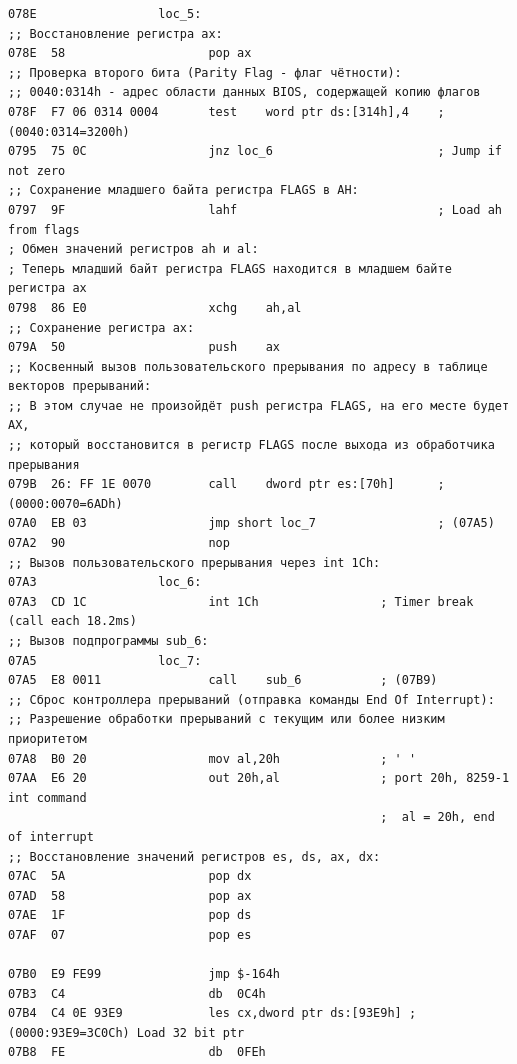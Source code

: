 \documentclass[a4paper,14pt]{article}
\begin{document}
\begin{lstlisting}[style={asm}]
078E				 loc_5:
;; Восстановление регистра ax:
078E  58					pop	ax
;; Проверка второго бита (Parity Flag - флаг чётности):
;; 0040:0314h - адрес области данных BIOS, содержащей копию флагов
078F  F7 06 0314 0004		test	word ptr ds:[314h],4	; (0040:0314=3200h)
0795  75 0C					jnz	loc_6						; Jump if not zero
;; Сохранение младшего байта регистра FLAGS в AH:
0797  9F					lahf							; Load ah from flags
; Обмен значений регистров ah и al: 
; Теперь младший байт регистра FLAGS находится в младшем байте регистра ax
0798  86 E0					xchg	ah,al
;; Сохранение регистра ax:
079A  50					push	ax
;; Косвенный вызов пользовательского прерывания по адресу в таблице векторов прерываний:
;; В этом случае не произойдёт push регистра FLAGS, на его месте будет AX, 
;; который восстановится в регистр FLAGS после выхода из обработчика прерывания
079B  26: FF 1E 0070		call	dword ptr es:[70h]		; (0000:0070=6ADh)
07A0  EB 03					jmp	short loc_7					; (07A5)
07A2  90					nop
;; Вызов пользовательского прерывания через int 1Ch:
07A3				 loc_6:
07A3  CD 1C					int	1Ch					; Timer break (call each 18.2ms)
;; Вызов подпрограммы sub_6:
07A5				 loc_7:
07A5  E8 0011				call	sub_6			; (07B9)
;; Сброс контроллера прерываний (отправка команды End Of Interrupt):
;; Разрешение обработки прерываний с текущим или более низким приоритетом
07A8  B0 20					mov	al,20h				; ' '
07AA  E6 20					out	20h,al				; port 20h, 8259-1 int command
													;  al = 20h, end of interrupt
;; Восстановление значений регистров es, ds, ax, dx:					
07AC  5A					pop	dx
07AD  58					pop	ax
07AE  1F					pop	ds
07AF  07					pop	es

07B0  E9 FE99				jmp	$-164h
07B3  C4					db	0C4h
07B4  C4 0E 93E9			les	cx,dword ptr ds:[93E9h]	; (0000:93E9=3C0Ch) Load 32 bit ptr
07B8  FE					db	0FEh
\end{lstlisting}
\clearpage
\end{document}
